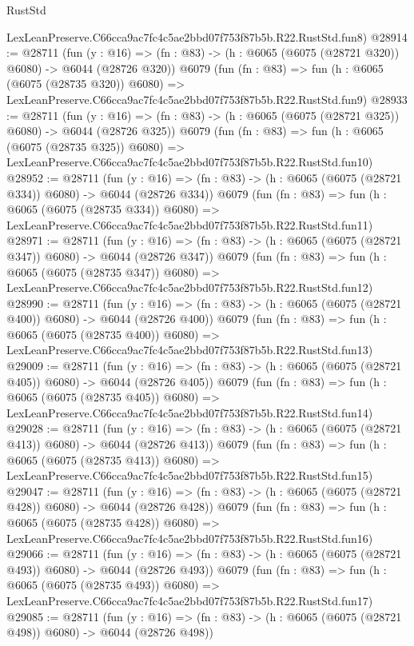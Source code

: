 \begin{lexlean}{RustStd}
\begin{coremodule}
    LexLeanPreserve.C66cca9ac7fc4c5ae2bbd07f753f87b5b.R22.RustStd.fun8)
@28914 := @28711
    (fun (y : @16) => (fn : @83) -> (h : @6065 (@6075 (@28721 @320)) @6080) -> @6044 (@28726 @320))
    @6079
    (fun (fn : @83) =>
    fun (h : @6065 (@6075 (@28735 @320)) @6080) =>
    LexLeanPreserve.C66cca9ac7fc4c5ae2bbd07f753f87b5b.R22.RustStd.fun9)
@28933 := @28711
    (fun (y : @16) => (fn : @83) -> (h : @6065 (@6075 (@28721 @325)) @6080) -> @6044 (@28726 @325))
    @6079
    (fun (fn : @83) =>
    fun (h : @6065 (@6075 (@28735 @325)) @6080) =>
    LexLeanPreserve.C66cca9ac7fc4c5ae2bbd07f753f87b5b.R22.RustStd.fun10)
@28952 := @28711
    (fun (y : @16) => (fn : @83) -> (h : @6065 (@6075 (@28721 @334)) @6080) -> @6044 (@28726 @334))
    @6079
    (fun (fn : @83) =>
    fun (h : @6065 (@6075 (@28735 @334)) @6080) =>
    LexLeanPreserve.C66cca9ac7fc4c5ae2bbd07f753f87b5b.R22.RustStd.fun11)
@28971 := @28711
    (fun (y : @16) => (fn : @83) -> (h : @6065 (@6075 (@28721 @347)) @6080) -> @6044 (@28726 @347))
    @6079
    (fun (fn : @83) =>
    fun (h : @6065 (@6075 (@28735 @347)) @6080) =>
    LexLeanPreserve.C66cca9ac7fc4c5ae2bbd07f753f87b5b.R22.RustStd.fun12)
@28990 := @28711
    (fun (y : @16) => (fn : @83) -> (h : @6065 (@6075 (@28721 @400)) @6080) -> @6044 (@28726 @400))
    @6079
    (fun (fn : @83) =>
    fun (h : @6065 (@6075 (@28735 @400)) @6080) =>
    LexLeanPreserve.C66cca9ac7fc4c5ae2bbd07f753f87b5b.R22.RustStd.fun13)
@29009 := @28711
    (fun (y : @16) => (fn : @83) -> (h : @6065 (@6075 (@28721 @405)) @6080) -> @6044 (@28726 @405))
    @6079
    (fun (fn : @83) =>
    fun (h : @6065 (@6075 (@28735 @405)) @6080) =>
    LexLeanPreserve.C66cca9ac7fc4c5ae2bbd07f753f87b5b.R22.RustStd.fun14)
@29028 := @28711
    (fun (y : @16) => (fn : @83) -> (h : @6065 (@6075 (@28721 @413)) @6080) -> @6044 (@28726 @413))
    @6079
    (fun (fn : @83) =>
    fun (h : @6065 (@6075 (@28735 @413)) @6080) =>
    LexLeanPreserve.C66cca9ac7fc4c5ae2bbd07f753f87b5b.R22.RustStd.fun15)
@29047 := @28711
    (fun (y : @16) => (fn : @83) -> (h : @6065 (@6075 (@28721 @428)) @6080) -> @6044 (@28726 @428))
    @6079
    (fun (fn : @83) =>
    fun (h : @6065 (@6075 (@28735 @428)) @6080) =>
    LexLeanPreserve.C66cca9ac7fc4c5ae2bbd07f753f87b5b.R22.RustStd.fun16)
@29066 := @28711
    (fun (y : @16) => (fn : @83) -> (h : @6065 (@6075 (@28721 @493)) @6080) -> @6044 (@28726 @493))
    @6079
    (fun (fn : @83) =>
    fun (h : @6065 (@6075 (@28735 @493)) @6080) =>
    LexLeanPreserve.C66cca9ac7fc4c5ae2bbd07f753f87b5b.R22.RustStd.fun17)
@29085 := @28711
    (fun (y : @16) => (fn : @83) -> (h : @6065 (@6075 (@28721 @498)) @6080) -> @6044 (@28726 @498))

\end{coremodule}
\end{lexlean}
